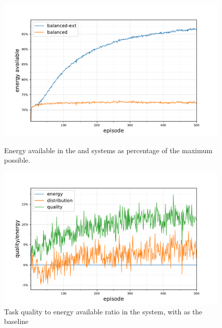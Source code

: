 \begin{figure}[ht]
	\begin{minipage}{.49\textwidth}
		\centering
		\includegraphics[width=1.0\linewidth,trim={25pt 0pt 50pt 0pt},clip]{5balanced_ctv-statistics-energy-available}
		\captionsetup{labelfont=bf,singlelinecheck=on}
		\caption{Energy available in the \simulationSimple{}{} and \simulationExtended{}{} \newline systems as percentage of the maximum possible.}
		\label{fig:ctv-statistics-energy-available}
	\end{minipage}\hfill%
	\begin{minipage}{.49\textwidth}
		\centering
		\includegraphics[width=1.0\linewidth,trim={25pt 0pt 50pt 0pt},clip]{5.19_ctv-quality-energy-baseline-comparison}
		\caption{Task quality to energy available ratio in the \newline  \simulationExtended{}{} system, with \algorithmEnergy{}{} as the baseline}
		\label{fig:ctv-quality-energy-baseline-comparison}
	\end{minipage}
\end{figure}
